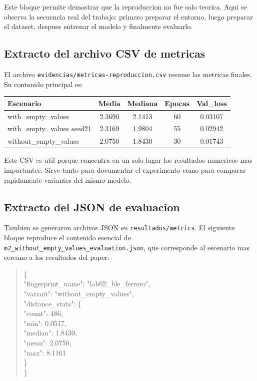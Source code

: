 \documentclass[11pt,a4paper]{article}
\begin{document}
Este bloque permite demostrar que la reproduccion no fue solo teorica. Aqui se observa la secuencia real del trabajo: primero preparar el entorno, luego preparar el dataset, despues entrenar el modelo y finalmente evaluarlo.

\subsection*{Extracto del archivo CSV de metricas}
El archivo \texttt{evidencias/metricas-reproduccion.csv} resume las metricas finales. Su contenido principal es:

\begin{center}
\begin{tabular}{>{\raggedright\arraybackslash}p{4.1cm}cccc}
\toprule
Escenario & Media & Mediana & Epocas & Val\_loss \\
\midrule
with\_empty\_values & 2.3690 & 2.1413 & 60 & 0.03107 \\
with\_empty\_values seed21 & 2.3169 & 1.9804 & 55 & 0.02942 \\
without\_empty\_values & 2.0750 & 1.8430 & 30 & 0.01743 \\
\bottomrule
\end{tabular}
\end{center}

Este CSV es util porque concentra en un solo lugar los resultados numericos mas importantes. Sirve tanto para documentar el experimento como para comparar rapidamente variantes del mismo modelo.

\subsection*{Extracto del JSON de evaluacion}
Tambien se generaron archivos JSON en \texttt{resultados/metrics}. El siguiente bloque reproduce el contenido esencial de \texttt{m2\_without\_empty\_values\_evaluation.json}, que corresponde al escenario mas cercano a los resultados del paper:

\begin{quote}
\ttfamily\footnotesize
\{\\
"fingerprint\_name": "lab02\_ble\_ferrero",\\
"variant": "without\_empty\_values",\\
"distance\_stats": \{\\
\hspace*{1em}"count": 486,\\
\hspace*{1em}"min": 0.0517,\\
\hspace*{1em}"median": 1.8430,\\
\hspace*{1em}"mean": 2.0750,\\
\hspace*{1em}"max": 8.1161\\
\}\\
\}
\end{quote}
\end{document}
